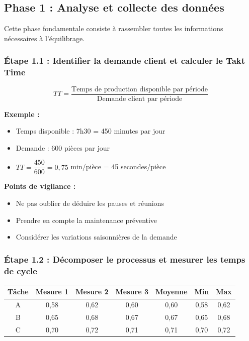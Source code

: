 \documentclass[12pt,a4paper]{article}
\newenvironment{methodbox}[1]
  {\begin{tcolorbox}[colback=blue!5!white, colframe=methodcolor, title=#1]\small}
  {\end{tcolorbox}}
\begin{document}
\subsection{Phase 1 : Analyse et collecte des données}

Cette phase fondamentale consiste à rassembler toutes les informations nécessaires à l'équilibrage.

\subsubsection{Étape 1.1 : Identifier la demande client et calculer le Takt Time}

\begin{methodbox}{Calcul du Takt Time}
\[
\boxed{TT = \frac{\text{Temps de production disponible par période}}{\text{Demande client par période}}}
\]

\textbf{Exemple :}
\begin{itemize}
    \item Temps disponible : 7h30 = 450 minutes par jour
    \item Demande : 600 pièces par jour
    \item $TT = \dfrac{450}{600} = 0,75$ min/pièce = 45 secondes/pièce
\end{itemize}
\end{methodbox}

\textbf{Points de vigilance :}
\begin{itemize}
    \item Ne pas oublier de déduire les pauses et réunions
    \item Prendre en compte la maintenance préventive
    \item Considérer les variations saisonnières de la demande
\end{itemize}

\subsubsection{Étape 1.2 : Décomposer le processus et mesurer les temps de cycle}

\begin{methodbox}{Fiche de mesure des temps}
\begin{table}[H]
\centering
\begin{tabular}{|c|c|c|c|c|c|c|}
\hline
\textbf{Tâche} & \textbf{Mesure 1} & \textbf{Mesure 2} & \textbf{Mesure 3} & \textbf{Moyenne} & \textbf{Min} & \textbf{Max} \\
\hline
A & 0,58 & 0,62 & 0,60 & 0,60 & 0,58 & 0,62 \\
\hline
B & 0,65 & 0,68 & 0,67 & 0,67 & 0,65 & 0,68 \\
\hline
C & 0,70 & 0,72 & 0,71 & 0,71 & 0,70 & 0,72 \\
\hline
\end{tabular}
\end{table}
\end{methodbox}
\end{document}
